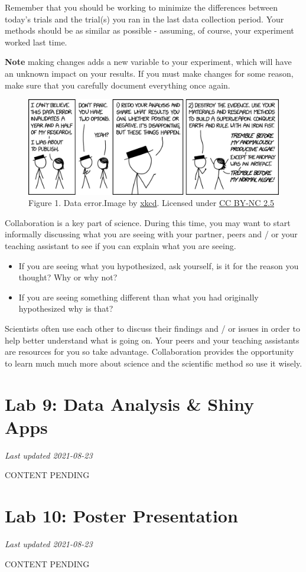 \documentclass[
]{book}
\providecommand{\tightlist}{%
  \setlength{\itemsep}{0pt}\setlength{\parskip}{0pt}}
\begin{document}
Remember that you should be working to minimize the differences between today's trials and the trial(s) you ran in the last data collection period. Your methods should be as similar as possible - assuming, of course, your experiment worked last time.

\textbf{Note} making changes adds a new variable to your experiment, which will have an unknown impact on your results. If you must make changes for some reason, make sure that you carefully document everything once again.

\begin{figure}
\centering
\includegraphics{figures_images/Lab8-Fig1.png}
\caption{Figure 1. Data error.Image by \href{https://xkcd.com/2239/}{xkcd}. Licensed under \href{https://creativecommons.org/licenses/by-nc/2.5/}{CC BY-NC 2.5}}
\end{figure}

Collaboration is a key part of science. During this time, you may want to start informally discussing what you are seeing with your partner, peers and / or your teaching assistant to see if you can explain what you are seeing.

\begin{itemize}
\tightlist
\item
  If you are seeing what you hypothesized, ask yourself, is it for the reason you thought? Why or why not?
\item
  If you are seeing something different than what you had originally hypothesized why is that?
\end{itemize}

Scientists often use each other to discuss their findings and / or issues in order to help better understand what is going on. Your peers and your teaching assistants are resources for you so take advantage. Collaboration provides the opportunity to learn much much more about science and the scientific method so use it wisely.

\hypertarget{lab-9-data-analysis-shiny-apps}{%
\chapter*{Lab 9: Data Analysis \& Shiny Apps}\label{lab-9-data-analysis-shiny-apps}}

\emph{Last updated 2021-08-23}

CONTENT PENDING

\hypertarget{lab-10-poster-presentation}{%
\chapter*{Lab 10: Poster Presentation}\label{lab-10-poster-presentation}}

\emph{Last updated 2021-08-23}

CONTENT PENDING
\end{document}

